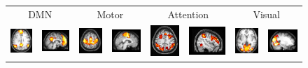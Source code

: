 \documentclass[runningheads, a4paper]{llncs}
\begin{document}
\begin{figure}[!t]
  \begin{center}
    \begin{tabular}{cccccccc}

      \multicolumn{2}{c}{DMN} &
      \multicolumn{2}{c}{Motor} &
      \multicolumn{2}{c}{Attention} &
      \multicolumn{2}{c}{Visual}\\

      \includegraphics[height=0.10\textwidth]{figures/workshop/mcem/dmn_a} &
      \includegraphics[height=0.10\textwidth]{figures/workshop/mcem/dmn_s} &
      \vspace{1pt}
      \includegraphics[height=0.10\textwidth]{figures/workshop/mcem/motor_a} &
      \includegraphics[height=0.10\textwidth]{figures/workshop/mcem/motor_s} &
      \vspace{1pt}
      \includegraphics[height=0.10\textwidth]{figures/workshop/mcem/atten_a} &
      \includegraphics[height=0.10\textwidth]{figures/workshop/mcem/atten_s} &
      \vspace{1pt}
      \includegraphics[height=0.10\textwidth]{figures/workshop/mcem/visual_a} &
      \includegraphics[height=0.10\textwidth]{figures/workshop/mcem/visual_s} \\

\end{tabular}
\end{center}
\end{figure}
\end{document}
